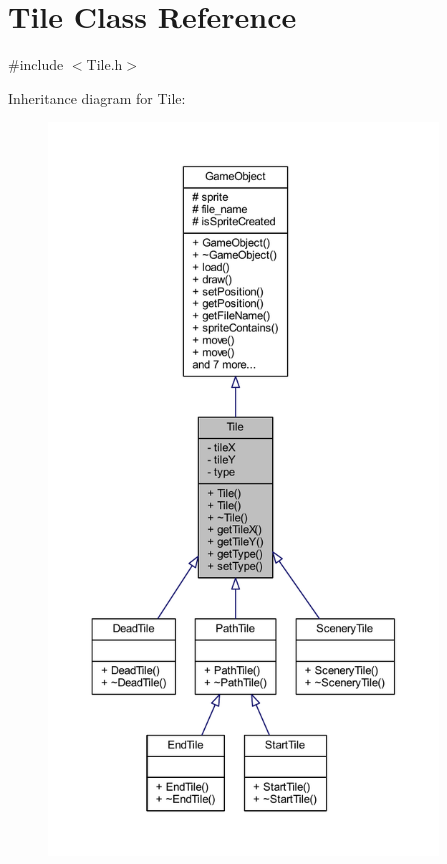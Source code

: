 \hypertarget{class_tile}{\section{Tile Class Reference}
\label{class_tile}
}


{\ttfamily \#include $<$Tile.\+h$>$}



Inheritance diagram for Tile\+:
\nopagebreak
\begin{figure}[H]
\begin{center}
\leavevmode
\includegraphics[height=550pt]{class_tile__inherit__graph}
\end{center}
\end{figure}


